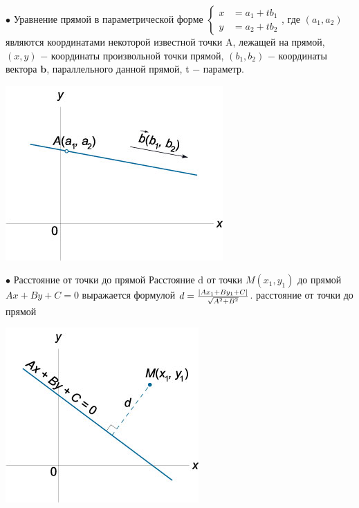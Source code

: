 \documentclass[oneside]{book}
\begin{document}
\begin{enumerate}
\begin{itemize}
\begin{enumerate}
$\bullet$ Уравнение прямой в параметрической форме
$\left\{ \begin{aligned} x &= {a_1} + t{b_1} \\ y &= {a_2} + t{b_2} \end{aligned} \right.$,
где $\left( {{a_1},{a_2}} \right)$ являются координатами некоторой известной точки A, лежащей на прямой, $\left( {x,y} \right)$ − координаты произвольной точки прямой, $\left( {{b_1},{b_2}} \right)$ − координаты вектора $\mathbf{b}$, параллельного данной прямой, t − параметр.
\begin{center}
\includegraphics[scale=0.4]{./pics/13.jpg}
\end{center}

$\bullet$ Расстояние от точки до прямой
Расстояние d от точки $M\left( {{x_1},{y_1}} \right)$ до прямой $Ax + By + C = 0$ выражается формулой
$d = \large\frac{{\left| {A{x_1} + B{y_1} + C} \right|}}{{\sqrt {{A^2} + {B^2}} }}\normalsize$.
расстояние от точки до прямой
\begin{center}
\includegraphics[scale=0.4]{./pics/14.jpg}
\end{center}


\end{enumerate}
\end{itemize}
\end{enumerate}
\end{document}
